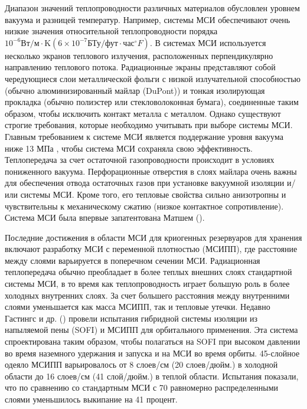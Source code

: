Диапазон значений теплопроводности различных материалов обусловлен уровнем вакуума и разницей температур. Например, системы МСИ обеспечивают очень низкие значения относительной теплопроводности порядка \(10^{-6} \text{Вт/м} \cdot \text{K} (6\times10^{-7} \text{БТу/фут}\cdot \text{час}^{\circ}F)\).
В системах МСИ используется несколько экранов теплового излучения, расположенных перпендикулярно направлению теплового потока. Радиационные экраны представляют собой чередующиеся слои металлической фольги с низкой излучательной способностью (обычно алюминизированный майлар (DuPont)) и тонкая изолирующая прокладка (обычно полиэстер или стекловолоконная бумага), соединенные таким образом, чтобы исключить контакт металла с металлом. Однако существуют строгие требования, которые необходимо учитывать при выборе системы МСИ. Главным требованием к системе МСИ является поддержание уровня вакуума ниже 13 МПа , чтобы система МСИ сохраняла свою эффективность. Теплопередача за счет остаточной газопроводности происходит в условиях пониженного вакуума. Перфорационные отверстия в слоях майлара очень важны для обеспечения отвода остаточных газов при установке вакуумной изоляции и/или системы МСИ. Кроме того, его тепловые свойства сильно анизотропны и чувствительны к механическому сжатию (низкое контактное сопротивление).  Система МСИ была впервые запатентована Матшем (\cite{matsch1961}).

Последние достижения в области МСИ для криогенных резервуаров для хранения включают разработку МСИ с переменной плотностью (МСИПП), где расстояние между слоями варьируется в поперечном сечении МСИ. Радиационная теплопередача обычно преобладает в более теплых внешних слоях стандартной системы МСИ, в то время как теплопроводность играет большую роль в более холодных внутренних слоях. За счет большего расстояния между внутренними слоями уменьшается как масса МСИПП, так и тепловые утечки. Недавно Гастингс и др. (\cite{hastings2004}) провели испытания гибридной системы изоляции из напыляемой пены (SOFI) и МСИПП для орбитального применения. Эта система спроектирована таким образом, чтобы полагаться на SOFI при высоком давлении во время наземного удержания и запуска и на МСИ во время орбиты. 45-слойное одеяло МСИПП варьировалось от 8 слоев/см (20 слоев/дюйм.) в холодной области до 16 слоев/см (41 слой/дюйм.) в теплой области. Испытания показали, что по сравнению со стандартным МСИ с 70 равномерно распределенными слоями уменьшилось выкипание на 41 процент.


